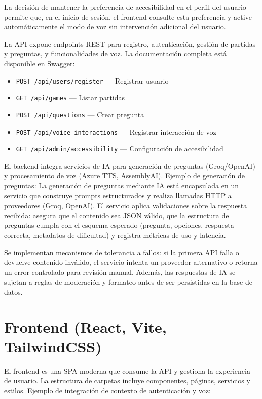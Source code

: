 \documentclass[12pt]{article}
\begin{document}
La decisión de mantener la preferencia de accesibilidad en el perfil del usuario permite que, en el inicio de sesión, el frontend consulte esta preferencia y active automáticamente el modo de voz sin intervención adicional del usuario.

La API expone endpoints REST para registro, autenticación, gestión de partidas y preguntas, y funcionalidades de voz. La documentación completa está disponible en Swagger:
\begin{itemize}
    \item \texttt{POST /api/users/register} — Registrar usuario
    \item \texttt{GET /api/games} — Listar partidas
    \item \texttt{POST /api/questions} — Crear pregunta
    \item \texttt{POST /api/voice-interactions} — Registrar interacción de voz
    \item \texttt{GET /api/admin/accessibility} — Configuración de accesibilidad
\end{itemize}

El backend integra servicios de IA para generación de preguntas (Groq/OpenAI) y procesamiento de voz (Azure TTS, AssemblyAI). Ejemplo de generación de preguntas:
La generación de preguntas mediante IA está encapsulada en un servicio que construye prompts estructurados y realiza llamadas HTTP a proveedores (Groq, OpenAI). El servicio aplica validaciones sobre la respuesta recibida: asegura que el contenido sea JSON válido, que la estructura de preguntas cumpla con el esquema esperado (pregunta, opciones, respuesta correcta, metadatos de dificultad) y registra métricas de uso y latencia.

Se implementan mecanismos de tolerancia a fallos: si la primera API falla o devuelve contenido inválido, el servicio intenta un proveedor alternativo o retorna un error controlado para revisión manual. Además, las respuestas de IA se sujetan a reglas de moderación y formateo antes de ser persistidas en la base de datos.

\section{Frontend (React, Vite, TailwindCSS)}
El frontend es una SPA moderna que consume la API y gestiona la experiencia de usuario. La estructura de carpetas incluye componentes, páginas, servicios y estilos. Ejemplo de integración de contexto de autenticación y voz:
\end{document}
